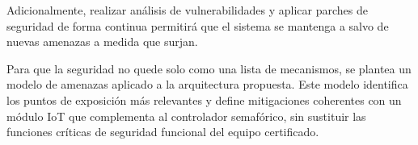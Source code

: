\documentclass[12pt,a4paper,oneside]{report}
\begin{document}
Adicionalmente, realizar análisis de vulnerabilidades y aplicar parches de seguridad de forma continua permitirá que el sistema se mantenga a salvo de nuevas amenazas a medida que surjan.

Para que la seguridad no quede solo como una lista de mecanismos, se plantea un modelo de amenazas aplicado a la arquitectura propuesta. Este modelo identifica los puntos de exposición más relevantes y define mitigaciones coherentes con un módulo IoT que complementa al controlador semafórico, sin sustituir las funciones críticas de seguridad funcional del equipo certificado.

\label{tbl:2.3a}
\end{document}

